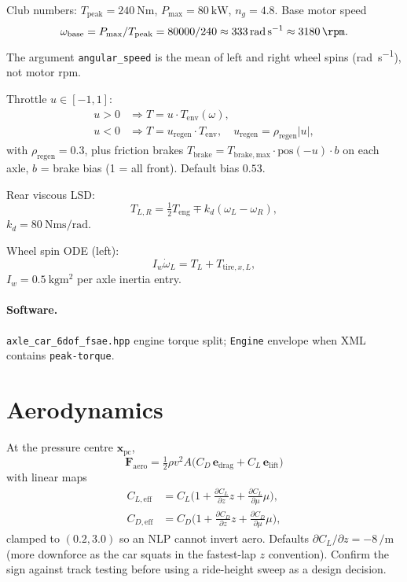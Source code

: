 \documentclass[11pt,letterpaper]{article}
\newcommand{\codepath}[1]{\paragraph{Software.} #1}
\begin{document}
Club numbers: $T_{\mathrm{peak}}=\SI{240}{\newton\metre}$,
$P_{\max}=\SI{80}{\kilo\watt}$, $n_g=4.8$. Base motor speed
\[
  \omega_{\mathrm{base}} = P_{\max}/T_{\mathrm{peak}}
  = 80000/240 \approx \SI{333}{\radian\per\second}
  \approx \SI{3180}{\rpm}.
\]
The argument \texttt{angular\_speed} is the mean of left and right
wheel spins (\si{\radian\per\second}), not motor rpm.

Throttle $u\in[-1,1]$:
\begin{align}
  u>0 &\Rightarrow T = u\cdot T_{\mathrm{env}}(\omega),\\
  u<0 &\Rightarrow T = u_{\mathrm{regen}}\cdot T_{\mathrm{env}},\quad
  u_{\mathrm{regen}} = \rho_{\mathrm{regen}} |u|,
\end{align}
with $\rho_{\mathrm{regen}}=0.3$, plus friction brakes
$T_{\mathrm{brake}} = T_{\mathrm{brake,max}}\cdot\mathrm{pos}(-u)\cdot b$
on each axle, $b$ = brake bias (1 = all front). Default bias $0.53$.

Rear viscous LSD:
\begin{equation}
  T_{L,R} = \tfrac12 T_{\mathrm{eng}} \mp k_d(\omega_L-\omega_R),
\end{equation}
$k_d=\SI{80}{\newton\metre\second\per\radian}$.

Wheel spin ODE (left):
\begin{equation}
  I_w \dot\omega_L = T_L + T_{\mathrm{tire},x,L},
\end{equation}
$I_w=\SI{0.5}{\kilo\gram\metre\squared}$ per axle inertia entry.

\codepath{\texttt{axle\_car\_6dof\_fsae.hpp} engine torque split;
\texttt{Engine} envelope when XML contains \texttt{peak-torque}.}

\section{Aerodynamics}
\label{sec:aero}

At the pressure centre $\mathbf{x}_{\mathrm{pc}}$,
\begin{equation}
  \mathbf{F}_{\mathrm{aero}}
  = \tfrac12\rho v^2 A \bigl( C_D\,\mathbf{e}_{\mathrm{drag}}
  + C_L\,\mathbf{e}_{\mathrm{lift}}\bigr)
\end{equation}
with linear maps
\begin{align}
  C_{L,\mathrm{eff}} &= C_L\bigl(1 + \tfrac{\partial C_L}{\partial z} z
    + \tfrac{\partial C_L}{\partial\mu}\mu\bigr),\\
  C_{D,\mathrm{eff}} &= C_D\bigl(1 + \tfrac{\partial C_D}{\partial z} z
    + \tfrac{\partial C_D}{\partial\mu}\mu\bigr),
\end{align}
clamped to $(0.2,3.0)$ so an NLP cannot invert aero. Defaults
$\partial C_L/\partial z = -8\,\si{\per\metre}$ (more downforce as the
car squats in the fastest-lap $z$ convention). Confirm the sign against
track testing before using a ride-height sweep as a design decision.
\end{document}
